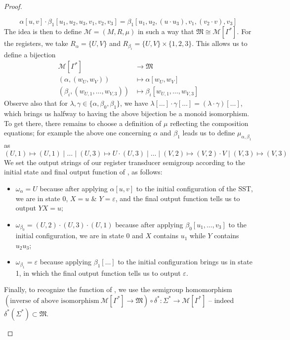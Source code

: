 \documentclass[a4paper,UKenglish,cleveref,autoref,thm-restate,numberwithinsect]{lipics-v2021}
\newcommand{\tito}[1]{\todo[inline,color=green!40]{Tito --- #1}}
\begin{document}
\begin{proof}
\begin{claimproof}
    \[ \alpha[u,v] \cdot \beta_1[u_1,u_2,u_3,v_1,v_2,v_3] = \beta_1[u_1,u_2,(u \cdot u_3),v_1,(v_2 \cdot v),v_3] \]
    The idea is then to define $\mathcal{M} = (M,R,\mu)$ in such a way that $\mathfrak{M} \cong \mathcal{M}[\Gamma^*]$. For the registers, we take $R_\alpha = \{U,V\}$ and $R_{\beta_i} = \{U,V\} \times \{1,2,3\}$. This allows us to define a bijection
    \begin{align*}
      \mathcal{M}[\Gamma^*] &\to \mathfrak{M}\\
      (\alpha, (w_{U}, w_{V})) &\mapsto \alpha[w_{U},w_{V}]\\
      (\beta_i, (w_{U,1},\dots,w_{V,3})) &\mapsto \beta_i[w_{U,1},\dots,w_{V,3}]
    \end{align*}
    Observe also that for $\lambda,\gamma\in\{\alpha,\beta_0,\beta_1\}$, we have $\lambda[\dots] \cdot \gamma[\dots] = (\lambda\cdot\gamma)[\dots]$, which brings us halfway to having the above bijection be a monoid isomorphism. To get there, there remains to choose a definition of $\mu$ reflecting the composition equations; for example the above one concerning $\alpha$ and $\beta_1$ leads us to define $\mu_{\alpha,\beta_1}$ as
    \[ (U,1)\mapsto(U,1) \mid \dots \mid (U,3) \mapsto U \cdot (U,3) \mid \dots \mid (V,2) \mapsto (V,2) \cdot V \mid (V,3) \mapsto (V,3) \]
    We set the output strings of our register transducer semigroup according to the initial state and final output function of , as follows:
    \begin{itemize}
      \item $\omega_\alpha = U$ because after applying $\alpha[u,v]$ to the initial configuration of the SST, we are in state 0, $X = u$ \& $Y = \varepsilon$, and the final output function tells us to output $YX = u$;
      \item $\omega_{\beta_0} = (U,2)\cdot(U,3)\cdot(U,1)$ because after applying $\beta_0[u_1,\dots,v_3]$ to the initial configuration, we are in state 0 and $X$ contains $u_1$ while $Y$ contains $u_2 u_3$;
      \item $\omega_{\beta_1} = \varepsilon$ because applying $\beta_1[\dots]$ to the initial configuration brings us in state 1, in which the final output function tells us to output $\varepsilon$.
    \end{itemize}
    Finally, to recognize the function of , we use the semigroup homomorphism $(\text{inverse of above isomorphism}\ \mathcal{M}[\Gamma^*] \to \mathfrak{M}) \circ \delta^* : \Sigma^* \to \mathcal{M}[\Gamma^*]$ -- indeed $\delta^*(\Sigma^*) \subset \mathfrak{M}$.
  \end{claimproof}

  \tito{todo when $f(\varepsilon) \neq \varepsilon$}
\end{proof}
\end{document}

